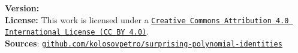 ﻿\noindent \textbf{Version:} 
\\[1em]
\noindent \textbf{License:} This work is licensed under a
\href{https://creativecommons.org/licenses/by/4.0/}
{\texttt{Creative Commons Attribution 4.0 International License (CC BY 4.0)}}.
\\[1em]
\noindent \textbf{Sources}:
\href{https://github.com/kolosovpetro/unexpected-polynomial-identities-classical-interpolation}
{\texttt{github.com/kolosovpetro/surprising-polynomial-identities}}
